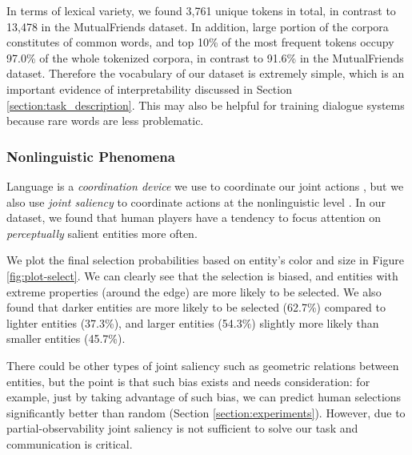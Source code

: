 \documentclass[letterpaper]{article} %
\begin{document}
In terms of lexical variety, we found 3,761 unique tokens in total, in contrast to 13,478 in the MutualFriends dataset. In addition, large portion of the corpora constitutes of common words, and top 10\% of the most frequent tokens occupy 97.0\% of the whole tokenized corpora, in contrast to 91.6\% in the MutualFriends dataset. Therefore the vocabulary of our dataset is extremely simple, which is an important evidence of interpretability discussed in Section \ref{section:task_description}. This may also be helpful for training dialogue systems because rare words are less problematic.

\subsubsection{Nonlinguistic Phenomena}

Language is a \emph{coordination device} we use to coordinate our joint actions \cite{lewis1969convention}, but we also use \emph{joint saliency} to coordinate actions at the nonlinguistic level \cite{schelling1980strategy}. In our dataset, we found that human players have a tendency to focus attention on \emph{perceptually} salient entities more often.

We plot the final selection probabilities based on entity's color and size in Figure \ref{fig:plot-select}. We can clearly see that the selection is biased, and entities with extreme properties (around the edge) are more likely to be selected. We also found that darker entities are more likely to be selected (62.7\%) compared to lighter entities (37.3\%), and larger entities (54.3\%) slightly more likely than smaller entities (45.7\%).

There could be other types of joint saliency such as geometric relations between entities, but the point is that such bias exists and needs consideration: for example, just by taking advantage of such bias, we can predict human selections significantly better than random (Section \ref{section:experiments}). However, due to partial-observability joint saliency is not sufficient to solve our task and communication is critical.
\end{document}
